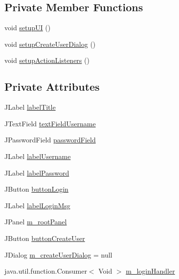 \subsection*{Private Member Functions}
\begin{DoxyCompactItemize}
\item 
void \mbox{\hyperlink{classcom_1_1activitytracker_1_1_login_window_a7af9edf52b3028437e2159f0be9893a9}{setup\+UI}} ()
\item 
void \mbox{\hyperlink{classcom_1_1activitytracker_1_1_login_window_a567db7b15448fe9d9c76addbcee4092b}{setup\+Create\+User\+Dialog}} ()
\item 
void \mbox{\hyperlink{classcom_1_1activitytracker_1_1_login_window_af1ff236b841c51bfb49e143344a3c3ac}{setup\+Action\+Listeners}} ()
\end{DoxyCompactItemize}
\subsection*{Private Attributes}
\begin{DoxyCompactItemize}
\item 
J\+Label \mbox{\hyperlink{classcom_1_1activitytracker_1_1_login_window_a3c4c84a656351094b34320a5c352e685}{label\+Title}}
\item 
J\+Text\+Field \mbox{\hyperlink{classcom_1_1activitytracker_1_1_login_window_aba181dcec114c349a67304406bcce92a}{text\+Field\+Username}}
\item 
J\+Password\+Field \mbox{\hyperlink{classcom_1_1activitytracker_1_1_login_window_ae53353ceea197fe7b93f1b7156112d08}{password\+Field}}
\item 
J\+Label \mbox{\hyperlink{classcom_1_1activitytracker_1_1_login_window_a4999e1461716e42ee4e3de8e3eb47eb9}{label\+Username}}
\item 
J\+Label \mbox{\hyperlink{classcom_1_1activitytracker_1_1_login_window_a8be41422fca8038bd8c2ba49af8ae6ce}{label\+Password}}
\item 
J\+Button \mbox{\hyperlink{classcom_1_1activitytracker_1_1_login_window_ac77d9f8f3a6c697a9847ecd130ac2ef6}{button\+Login}}
\item 
J\+Label \mbox{\hyperlink{classcom_1_1activitytracker_1_1_login_window_a567ae49b39c07840b39eec92fdf92c22}{label\+Login\+Msg}}
\item 
J\+Panel \mbox{\hyperlink{classcom_1_1activitytracker_1_1_login_window_aa62049382baddb801cb25201814efc57}{m\+\_\+root\+Panel}}
\item 
J\+Button \mbox{\hyperlink{classcom_1_1activitytracker_1_1_login_window_a1ff77d6846d01d4a8540371ede091371}{button\+Create\+User}}
\item 
J\+Dialog \mbox{\hyperlink{classcom_1_1activitytracker_1_1_login_window_a49ff7093e29ce7bd22c42ac8099d5d34}{m\+\_\+create\+User\+Dialog}} = null
\item 
java.\+util.\+function.\+Consumer$<$ Void $>$ \mbox{\hyperlink{classcom_1_1activitytracker_1_1_login_window_aab28a8e6372499a8690d524dedeaf9e1}{m\+\_\+login\+Handler}}
\end{DoxyCompactItemize}


